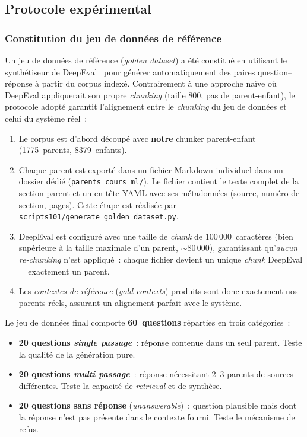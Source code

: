 \documentclass[11pt,a4paper]{article}
\begin{document}
\subsection{Protocole expérimental}

\subsubsection{Constitution du jeu de données de référence}

Un jeu de données de référence (\textit{golden dataset}) a été constitué en utilisant le synthétiseur de DeepEval~\cite{deepeval2024} pour générer automatiquement des paires question--réponse à partir du corpus indexé. Contrairement à une approche naïve où DeepEval appliquerait son propre \textit{chunking} (taille 800, pas de parent-enfant), le protocole adopté garantit l'alignement entre le \textit{chunking} du jeu de données et celui du système réel~:

\begin{enumerate}
  \item Le corpus est d'abord découpé avec \textbf{notre} chunker parent-enfant (1775~parents, 8379~enfants).
  \item Chaque parent est exporté dans un fichier Markdown individuel dans un dossier dédié (\texttt{parents\_cours\_ml/}). Le fichier contient le texte complet de la section parent et un en-tête YAML avec ses métadonnées (source, numéro de section, pages). Cette étape est réalisée par \texttt{scripts101/generate\_golden\_dataset.py}.
  \item DeepEval est configuré avec une taille de \textit{chunk} de 100\,000~caractères (bien supérieure à la taille maximale d'un parent, $\sim$80\,000), garantissant qu'\textit{aucun re-chunking} n'est appliqué~: chaque fichier devient un unique \textit{chunk} DeepEval = exactement un parent.
  \item Les \textit{contextes de référence} (\textit{gold contexts}) produits sont donc exactement nos parents réels, assurant un alignement parfait avec le système.
\end{enumerate}

Le jeu de données final comporte \textbf{60~questions} réparties en trois catégories~:
\begin{itemize}
  \item \textbf{20 questions \textit{single passage}}~: réponse contenue dans un seul parent. Teste la qualité de la génération pure.
  \item \textbf{20 questions \textit{multi passage}}~: réponse nécessitant 2--3 parents de sources différentes. Teste la capacité de \textit{retrieval} et de synthèse.
  \item \textbf{20 questions sans réponse} (\textit{unanswerable})~: question plausible mais dont la réponse n'est pas présente dans le contexte fourni. Teste le mécanisme de refus.
\end{itemize}
\end{document}
